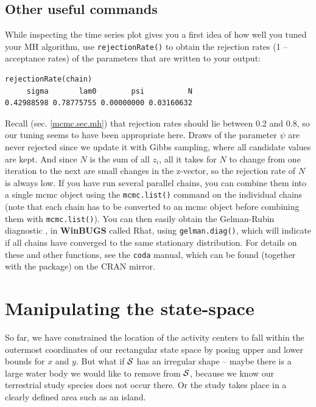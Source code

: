 \subsection{Other useful commands }
While inspecting the time series plot gives you a first idea of how well you tuned your MH algorithm, use \verb#rejectionRate()# to obtain the rejection rates (1 -- acceptance rates) of the parameters that are written to your output:
\begin{verbatim}
rejectionRate(chain)
     sigma       lam0        psi          N
0.42988598 0.78775755 0.00000000 0.03160632
\end{verbatim}
 Recall (sec. \ref{mcmc.sec.mh}) that rejection rates should lie between 0.2 and 0.8, so our tuning seems to have been appropriate here. Draws of the parameter $\psi$ are never rejected since we update it with Gibbs sampling, where all candidate values are kept. And since $N$ is the sum of all $z_i$, all it takes for $N$ to change from one iteration to the next are small changes in the z-vector, so the rejection rate of $N$ is always low.
If you have run several parallel chains, you can combine them into a single mcmc object using the \verb#mcmc.list()# command on the individual chains (note that each chain has to be converted to an mcmc object before combining them with \verb#mcmc.list()#). You can then easily obtain the Gelman-Rubin diagnostic \citep{gelman_etal:2004}, in {\bf WinBUGS} called Rhat, using \verb#gelman.diag()#, which
will indicate if all chains have converged to the same stationary distribution.
For details on these and other functions, see the \mbox{\tt coda} manual,
which can be found (together with the package) on the CRAN mirror.

\section{Manipulating the state-space}
\label{mcmc.sec.state-space}

So far, we have constrained the location of the activity centers to fall
within the outermost coordinates of our rectangular state space by posing
upper and lower bounds for $x$ and $y$. But what if ${\cal S}$
has an irregular
shape -- maybe there is a large water body we would like to remove from
${\cal S}$, because we know our terrestrial study species does not occur there.
Or the study takes place in a clearly defined area such as an island.

